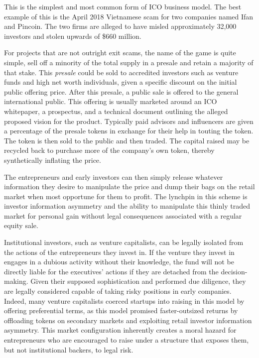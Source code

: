 This is the simplest and most common form of ICO business model. The best
example of this is the April 2018 Vietnamese scam for two companies named Ifan
and Pincoin. The two firms are alleged to have misled approximately 32,000
investors and stolen upwards of \$660 million. \cite{benedetti_digital_2018}

For projects that are not outright exit scams, the name of the game is quite
simple, sell off a minority of the total supply in a presale and retain a
majority of that stake. This \textit{presale} could be sold to accredited
investors such as venture funds and high net worth individuals, given a specific
discount on the initial public offering price. After this presale, a public sale
is offered to the general international public. This offering is usually
marketed around an ICO whitepaper, a prospectus, and a technical document
outlining the alleged proposed vision for the product. Typically paid advisors
and influencers are given a percentage of the presale tokens in exchange for
their help in touting the token. The token is then sold to the public and then
traded. The capital raised may be recycled back to purchase more of the
company's own token, thereby synthetically inflating the price.


The entrepreneurs and early investors can then simply release whatever
information they desire to manipulate the price and dump their bags on the
retail market when most opportune for them to profit. The lynchpin in this
scheme is investor information asymmetry and the ability to manipulate this
thinly traded market for personal gain without legal consequences associated
with a regular equity sale. \cite{boreiko_serial_2020}

Institutional investors, such as venture capitalists, can be legally isolated
from the actions of the entrepreneurs they invest in. If the venture they invest
in engages in a dubious activity without their knowledge, the fund will not be
directly liable for the executives' actions if they are detached from the
decision-making. Given their supposed sophistication and performed due
diligence, they are legally considered capable of taking risky positions in
early companies. Indeed, many venture capitalists coerced startups into raising
in this model by offering preferential terms, as this model promised
faster-outsized returns by offloading tokens on secondary markets and exploiting
retail investor information asymmetry. This market configuration inherently
creates a moral hazard for entrepreneurs who are encouraged to raise under a
structure that exposes them, but not institutional backers, to legal risk.

